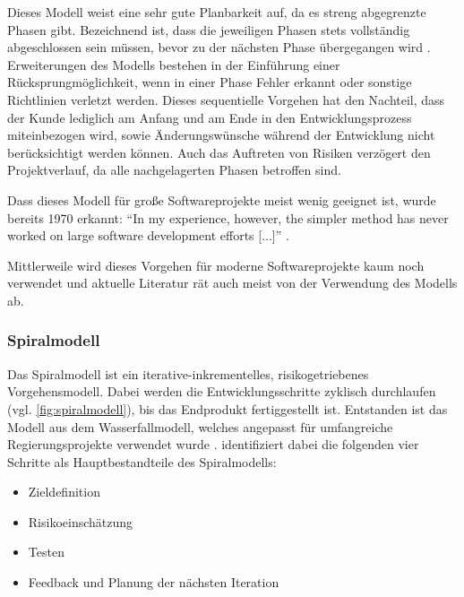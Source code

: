 Dieses Modell weist eine sehr gute Planbarkeit auf, da es streng abgegrenzte Phasen gibt. 
Bezeichnend ist, dass die jeweiligen Phasen stets vollständig abgeschlossen sein müssen, bevor zu der nächsten Phase übergegangen wird \parencite[vgl.][S. 48]{Schatten:2010aa}.
Erweiterungen des Modells bestehen in der Einführung einer Rücksprungmöglichkeit, wenn in einer Phase Fehler erkannt oder sonstige Richtlinien verletzt werden.
Dieses sequentielle Vorgehen hat den Nachteil, dass der Kunde lediglich am Anfang und am Ende in den Entwicklungsprozess miteinbezogen wird, sowie Änderungswünsche während der Entwicklung nicht berücksichtigt werden können.
Auch das Auftreten von Risiken verzögert den Projektverlauf, da alle nachgelagerten Phasen betroffen sind.

Dass dieses Modell für große Softwareprojekte meist wenig geeignet ist, wurde bereits 1970 erkannt: \enquote{In my experience, however, the simpler method has never worked on large software development efforts [...]} \parencite[][S. 335]{Royce:1970aa}.

Mittlerweile wird dieses Vorgehen für moderne Softwareprojekte kaum noch verwendet und aktuelle Literatur rät auch meist von der Verwendung des Modells ab.
\parencite[Vgl.][S. 49]{Schatten:2010aa}

\subsubsection{Spiralmodell}

Das Spiralmodell ist ein iterative-inkrementelles, risikogetriebenes Vorgehensmodell.
Dabei werden die Entwicklungsschritte zyklisch durchlaufen (vgl. \autoref{fig:spiralmodell}), bis das Endprodukt fertiggestellt ist.
Entstanden ist das Modell aus dem Wasserfallmodell, welches angepasst für umfangreiche Regierungsprojekte verwendet wurde \parencite[vgl.][S. 64]{Boehm:1988aa}.
\parencite[][S. 57]{Schatten:2010aa} identifiziert dabei die folgenden vier Schritte als Hauptbestandteile des Spiralmodells:

\begin{itemize}
\item Zieldefinition
\item Risikoeinschätzung
\item Testen
\item Feedback und Planung der nächsten Iteration
\end{itemize}

